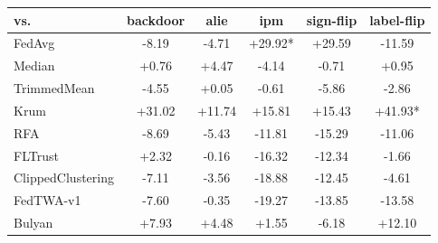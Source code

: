 \begin{tabular}{lccccc}
\toprule
vs. & backdoor & alie & ipm & sign-flip & label-flip \\
\midrule
FedAvg & -8.19 & -4.71 & +29.92* & +29.59 & -11.59 \\
Median & +0.76 & +4.47 & -4.14 & -0.71 & +0.95 \\
TrimmedMean & -4.55 & +0.05 & -0.61 & -5.86 & -2.86 \\
Krum & +31.02 & +11.74 & +15.81 & +15.43 & +41.93* \\
RFA & -8.69 & -5.43 & -11.81 & -15.29 & -11.06 \\
FLTrust & +2.32 & -0.16 & -16.32 & -12.34 & -1.66 \\
ClippedClustering & -7.11 & -3.56 & -18.88 & -12.45 & -4.61 \\
FedTWA-v1 & -7.60 & -0.35 & -19.27 & -13.85 & -13.58 \\
Bulyan & +7.93 & +4.48 & +1.55 & -6.18 & +12.10 \\
\bottomrule
\end{tabular}